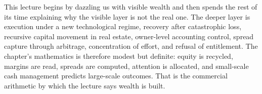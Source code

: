 This lecture begins by dazzling us with visible wealth and then spends the rest of its time explaining why the visible layer is not the real one. The deeper layer is execution under a new technological regime, recovery after catastrophic loss, recursive capital movement in real estate, owner-level accounting control, spread capture through arbitrage, concentration of effort, and refusal of entitlement. The chapter's mathematics is therefore modest but definite: equity is recycled, margins are read, spreads are computed, attention is allocated, and small-scale cash management predicts large-scale outcomes. That is the commercial arithmetic by which the lecture says wealth is built.